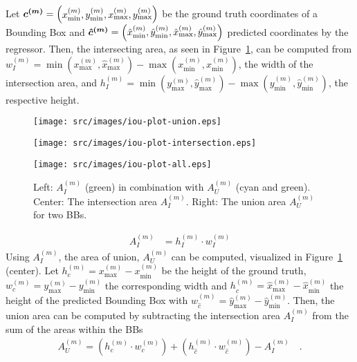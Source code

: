 Let
$
\bm{c^{(m)}} = \begin{pmatrix}
        x^{(m)}_{\min},
        y^{(m)}_{\min},
        x^{(m)}_{\max},
        y^{(m)}_{\max}
\end{pmatrix}
$ be the ground truth coordinates of a Bounding Box
and
$\bm{\hat{c}^{(m)}}=    \left(\hat{x}^{(m)}_{\min},\hat{y}^{(m)}_{\min},\hat{x}^{(m)}_{\max}, \hat{y}^{(m)}_{\max}\right)$
predicted coordinates by the regressor.
Then, the intersecting area, as seen in Figure~\ref{fig:iou}, can be computed from $w^{(m)}_I = \min(x^{(m)}_{\max}, \hat{x}^{(m)}_{\max}) - \max(x^{(m)}_{\min}, \hat{x}^{(m)}_{\min})$, the width of the intersection area, and $h^{(m)}_I = \min(y^{(m)}_{\max}, \hat{y}^{(m)}_{\max})-\max(y^{(m)}_{\min}, \hat{y}^{(m)}_{\min})$, the respective height.

\begin{figure}[!ht]
    \centering
\begin{minipage}{0.28\textwidth}
    \texttt{[image: src/images/iou-plot-union.eps]}
\end{minipage}
\begin{minipage}{0.28\textwidth}
    \texttt{[image: src/images/iou-plot-intersection.eps]}
\end{minipage}
\begin{minipage}{0.28\textwidth}
    \texttt{[image: src/images/iou-plot-all.eps]}
    \end{minipage}
    \caption{Left: $A^{(m)}_I$ (green) in combination with $A^{(m)}_U$ (cyan and green). Center: The intersection area $A^{(m)}_I$. Right: The union area $A^{(m)}_U$ for two BBs.}
    \label{fig:iou}
\end{figure}
\begin{align}
    A^{(m)}_I &= h^{(m)}_I \cdot w^{(m)}_I
\end{align}
Using $A^{(m)}_I$, the area of union, $A^{(m)}_U$ can be computed, visualized in Figure~\ref{fig:iou} (center).
Let $h^{(m)}_c = x^{(m)}_{\max}-x^{(m)}_{\min}$ be the height of the ground truth, $w^{(m)}_c = y^{(m)}_{\max}-y^{(m)}_{\min}$ the corresponding width and $h^{(m)}_{\hat{c}}=\hat{x}^{(m)}_{\max}-\hat{x}^{(m)}_{\min}$ the height of the predicted Bounding Box with $w^{(m)}_{\hat{c}} = \hat{y}^{(m)}_{\max}-\hat{y}^{(m)}_{\min}$.
Then, the union area can be computed by subtracting the intersection area $A^{(m)}_I$ from the sum of the areas within the BBs
\begin{align}
    A^{(m)}_U = (h^{(m)}_c\cdot w^{(m)}_c) + (h^{(m)}_{\hat{c}} \cdot w^{(m)}_{\hat{c}}) - A^{(m)}_I\quad .
\end{align}

